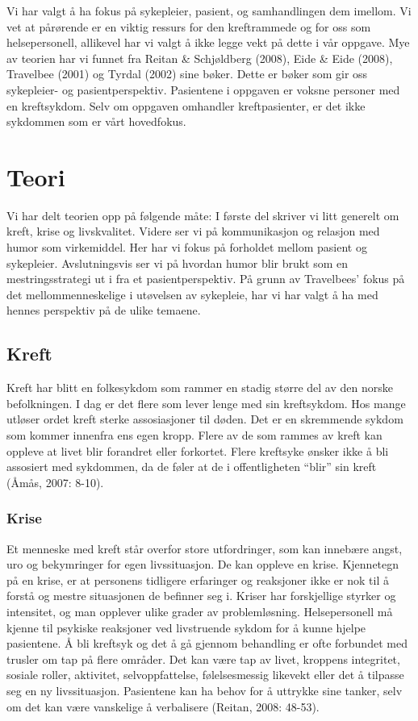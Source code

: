 Vi har valgt å ha fokus på sykepleier, pasient, og samhandlingen dem imellom.
Vi vet at pårørende er en viktig ressurs for den kreftrammede og for oss som
helsepersonell, allikevel har vi valgt å ikke legge vekt på dette i vår
oppgave. Mye av teorien har vi funnet fra Reitan \&{} Schjøldberg (2008), Eide
\&
Eide (2008), Travelbee (2001) og Tyrdal (2002) sine bøker. Dette er bøker som
gir oss sykepleier- og pasientperspektiv. Pasientene i oppgaven er voksne
personer med en kreftsykdom. Selv om oppgaven omhandler kreftpasienter, er det
ikke sykdommen som er vårt hovedfokus.

\chapter{Teori}

Vi har delt teorien opp på følgende måte: I første del skriver vi litt generelt
om kreft, krise og livskvalitet. Videre ser vi på kommunikasjon og relasjon med
humor som virkemiddel. Her har vi fokus på forholdet mellom pasient og
sykepleier. Avslutningsvis ser vi på hvordan humor blir brukt som en
mestringsstrategi ut i fra et pasientperspektiv. På grunn av Travelbees’ fokus
på det mellommenneskelige i utøvelsen av sykepleie, har vi har valgt å ha med
hennes perspektiv på de ulike temaene.

\section{Kreft}

Kreft har blitt en folkesykdom som rammer en stadig større del av den norske
befolkningen.  I dag er det flere som lever lenge med sin kreftsykdom. Hos
mange utløser ordet kreft sterke assosiasjoner til døden. Det er en skremmende
sykdom som kommer innenfra ens egen kropp. Flere av de som rammes av kreft kan
oppleve at livet blir forandret eller forkortet. Flere kreftsyke ønsker ikke å
bli assosiert med sykdommen, da de føler at de i offentligheten “blir” sin
kreft (Åmås, 2007: 8-10).

\subsection{Krise}

Et menneske med kreft står overfor store utfordringer, som kan innebære angst,
uro og bekymringer for egen livssituasjon. De kan oppleve en krise. Kjennetegn
på en krise, er at personens tidligere erfaringer og reaksjoner ikke er nok til
å forstå og mestre situasjonen de befinner seg i. Kriser har forskjellige
styrker og intensitet, og man opplever ulike grader av problemløsning.
Helsepersonell må kjenne til psykiske reaksjoner ved livstruende sykdom for å
kunne hjelpe pasientene. Å bli kreftsyk og det å gå gjennom behandling er ofte
forbundet med trusler om tap på flere områder. Det kan være tap av livet,
kroppens integritet, sosiale roller, aktivitet, selvoppfattelse, følelsesmessig
likevekt eller det å tilpasse seg en ny livssituasjon. Pasientene kan ha behov
for å uttrykke sine tanker, selv om det kan være vanskelige å verbalisere
(Reitan, 2008: 48-53).


